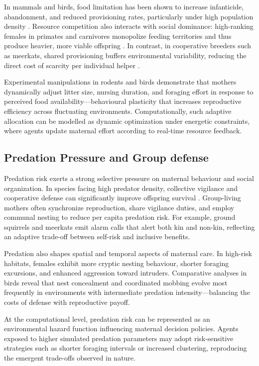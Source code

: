         In mammals and birds, food limitation has been shown to increase infanticide, abandonment, and reduced provisioning rates, particularly under high population density \cite{stockley2011}.  Resource competition also interacts with social dominance: high-ranking females in primates and carnivores monopolize feeding territories and thus produce heavier, more viable offspring \cite{sapolsky2005}.  In contrast, in cooperative breeders such as meerkats, shared provisioning buffers environmental variability, reducing the direct cost of scarcity per individual helper \cite{cluttonbrock2002}.  
        
        Experimental manipulations in rodents and birds demonstrate that mothers dynamically adjust litter size, nursing duration, and foraging effort in response to perceived food availability—behavioural plasticity that increases reproductive efficiency across fluctuating environments.  Computationally, such adaptive allocation can be modelled as dynamic optimization under energetic constraints, where agents update maternal effort according to real-time resource feedback.

    \subsection{Predation Pressure and Group defense}

        Predation risk exerts a strong selective pressure on maternal behaviour and social organization.  In species facing high predator density, collective vigilance and cooperative defense can significantly improve offspring survival \cite{ebensperger2001, ridley2007}.  Group-living mothers often synchronize reproduction, share vigilance duties, and employ communal nesting to reduce per capita predation risk.  For example, ground squirrels and meerkats emit alarm calls that alert both kin and non-kin, reflecting an adaptive trade-off between self-risk and inclusive benefits.
        
        Predation also shapes spatial and temporal aspects of maternal care.  In high-risk habitats, females exhibit more cryptic nesting behaviour, shorter foraging excursions, and enhanced aggression toward intruders.  Comparative analyses in birds reveal that nest concealment and coordinated mobbing evolve most frequently in environments with intermediate predation intensity—balancing the costs of defense with reproductive payoff.  
        
        At the computational level, predation risk can be represented as an environmental hazard function influencing maternal decision policies.  Agents exposed to higher simulated predation parameters may adopt risk-sensitive strategies such as shorter foraging intervals or increased clustering, reproducing the emergent trade-offs observed in nature.

